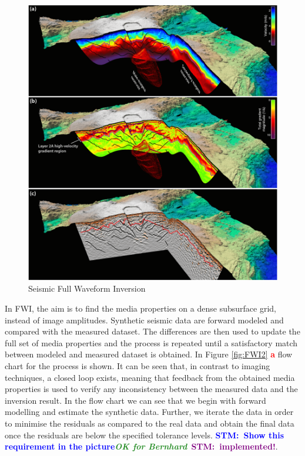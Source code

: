 \documentclass[10pt,a4paper]{article}
\newcommand{\commentstm}[1]{\textcolor{blue}{\textbf{STM:\ #1}}}
\newcommand{\commentstmtwo}[1]{\textcolor{purple}{\textbf{STM:\ #1}}}
\newcommand{\newstm}[1]{\textcolor{red}{\textbf{#1}}}
\newcommand{\brok}{\textcolor{ForestGreen}{\textit{\textbf{OK for Bernhard}}}}
\begin{document}
\begin{figure}[h!]
  \includegraphics[width=0.75\linewidth]{FWI1.png}
  \caption{Seismic Full Waveform Inversion}
  \label{fig:FWI1}
\end{figure}

In FWI, the aim is to find the media properties on a dense subsurface
grid, instead of image amplitudes. Synthetic seismic data are forward
modeled and compared with the measured dataset. The differences are
then used to update the full set of media properties and the process
is repeated until a satisfactory match between modeled and measured
dataset is obtained. In Figure \ref{fig:FWI2} \newstm{a} flow chart
for the process is shown. It can be seen that, in contrast to imaging
techniques, a closed loop exists, meaning that feedback from the
obtained media properties is used to verify any inconsistency between
the measured data and the inversion result. In the flow chart we can
see that we begin with forward modelling and estimate the synthetic
data. Further, we iterate the data in order to minimise the residuals
as compared to the real data and obtain the final data once the
residuals are below the specified tolerance levels.
\commentstm{Show this requirement in the picture}\brok\ \commentstmtwo{implemented!}.
\end{document}
